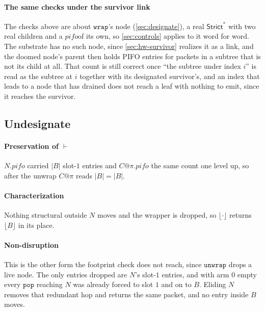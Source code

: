 \documentclass[sigplan,anonymous,review,nonacm]{acmart}
\newcommand{\pop}{\ensuremath{\mathtt{pop}}}
\newcommand{\notation}[1]{\ensuremath{#1}\ifmmode\else\xspace\fi}
\newcommand{\pifo}{\notation{\mathit{pifo}}}
\newcommand{\Strictstar}{\textsf{Strict}^{*}}
\newcommand{\Undesignate}{\textsf{Undesignate}}
\begin{document}
\paragraph{The same checks under the survivor link}
The checks above are about \(\mathtt{wrap}\)'s node (\cref{sec:designate}), a real \(\Strictstar\) with two real children and a \pifo of its own, so \cref{sec:controls} applies to it word for word.
The substrate has no such node, since \cref{sec:hw-survivor} realizes it as a link, and the doomed node's parent then holds PIFO entries for packets in a subtree that is not its child at all.
That count is still correct once ``the subtree under index \(i\)'' is read as the subtree at \(i\) together with its designated survivor's, and an index that leads to a node that has drained does not reach a leaf with nothing to emit, since it reaches the survivor.

\subsection{\texorpdfstring{\Undesignate}{Undesignate}}\label{sec:check-undesignate}

\paragraph{Preservation of \(\vdash\)}
\(N.\mathit{pifo}\) carried \(|B|\) slot-\(1\) entries and \(C@\pi.\mathit{pifo}\) the same count one level up, so after the unwrap \(C@\pi\) reads \(|B| = |B|\).

\paragraph{Characterization}
Nothing structural outside \(N\) moves and the wrapper is dropped, so \(\lfloor \cdot \rfloor\) returns \(\lfloor B \rfloor\) in its place.

\paragraph{Non-disruption}
This is the other form the footprint check does not reach, since \(\mathtt{unwrap}\) drops a live node.
The only entries dropped are \(N\)'s slot-\(1\) entries, and with arm 0 empty every \pop{} reaching \(N\) was already forced to slot \(1\) and on to \(B\).
Eliding \(N\) removes that redundant hop and returns the same packet, and no entry inside \(B\) moves.
\end{document}
